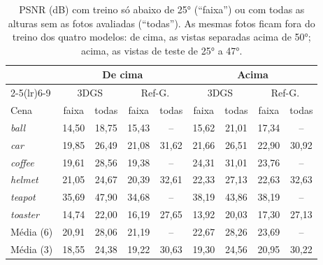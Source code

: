 \begin{table}[t]
\centering
\caption{PSNR (dB) com treino só abaixo de 25° (``faixa'') ou com todas as alturas sem as fotos avaliadas (``todas''). As mesmas fotos ficam fora do treino dos quatro modelos: de cima, as vistas separadas acima de 50°; acima, as vistas de teste de 25° a 47°.}
\label{tab:holdout25}
\setlength{\tabcolsep}{3pt}
\footnotesize
\begin{tabular}{l cccc cccc}
\toprule
 & \multicolumn{4}{c}{De cima} & \multicolumn{4}{c}{Acima} \\
\cmidrule(lr){2-5}\cmidrule(lr){6-9}
 & \multicolumn{2}{c}{3DGS} & \multicolumn{2}{c}{Ref-G.} & \multicolumn{2}{c}{3DGS} & \multicolumn{2}{c}{Ref-G.} \\
Cena & faixa & todas & faixa & todas & faixa & todas & faixa & todas \\
\midrule
\textit{ball} & 14{,}50 & 18{,}75 & 15{,}43 & -- & 15{,}62 & 21{,}01 & 17{,}34 & -- \\
\textit{car} & 19{,}85 & 26{,}49 & 21{,}08 & 31{,}62 & 21{,}66 & 26{,}51 & 22{,}90 & 30{,}92 \\
\textit{coffee} & 19{,}61 & 28{,}56 & 19{,}38 & -- & 24{,}31 & 31{,}01 & 23{,}76 & -- \\
\textit{helmet} & 21{,}05 & 24{,}67 & 20{,}39 & 32{,}61 & 22{,}33 & 27{,}13 & 22{,}63 & 32{,}63 \\
\textit{teapot} & 35{,}69 & 47{,}90 & 34{,}68 & -- & 38{,}19 & 43{,}86 & 38{,}19 & -- \\
\textit{toaster} & 14{,}74 & 22{,}00 & 16{,}19 & 27{,}65 & 13{,}92 & 20{,}03 & 17{,}30 & 27{,}13 \\
\midrule
Média (6) & 20{,}91 & 28{,}06 & 21{,}19 & -- & 22{,}67 & 28{,}26 & 23{,}69 & -- \\
Média (3) & 18{,}55 & 24{,}38 & 19{,}22 & 30{,}63 & 19{,}30 & 24{,}56 & 20{,}95 & 30{,}22 \\
\bottomrule
\end{tabular}
\end{table}
